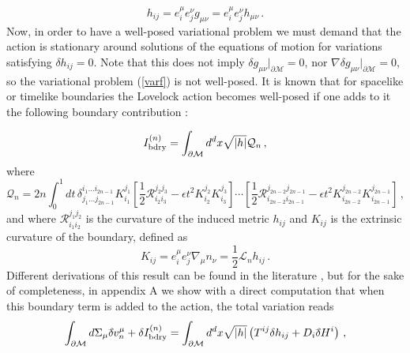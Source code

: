 \documentclass[11pt,letterpaper]{article}
\newcommand{\dslash}{\delta^{\!\!\!\!-}\!}
\begin{document}
\begin{equation}
h_{ij}=e_i^{\mu}e_j^{\nu}g_{\mu\nu}=e_i^{\mu}e_j^{\nu}h_{\mu\nu}\, .
\end{equation}
Now, in order to have a well-posed variational problem we must demand that the action is stationary around solutions of the equations of motion for variations satisfying $\delta h_{ij}=0$.  Note that this does not imply $\delta g_{\mu\nu}\Big|_{\partial \mathcal{M}}=0$, nor $\nabla\delta g_{\mu\nu}\Big|_{\partial \mathcal{M}}=0$, so the variational problem (\ref{varf}) is not well-posed. It is known that for spacelike or timelike boundaries the Lovelock action becomes well-posed if one adds to it the following boundary contribution \cite{Teitelboim:1987zz,Myers:1987yn}:

\begin{equation}\label{bdry}
I_{\rm bdry}^{(n)}=\int_{\partial \mathcal{M}}d^{d}x\sqrt{|h|}\mathcal{Q}_{n}\, ,
\end{equation}
where
\begin{equation}
\mathcal{Q}_{n}=2n\int_0^1dt\, \delta^{i_1\dots i_{2n-1}}_{j_1\dots j_{2n-1}}K^{j_1}_{i_1}\left[\frac{1}{2}\mathcal{R}^{j_2 j_3}_{i_2i_3}-\epsilon t^2K^{j_2}_{i_2}K^{j_3}_{i_3}\right]\cdots \left[\frac{1}{2}\mathcal{R}^{j_{2n-2}j_{2n-1}}_{i_{2n-2}i_{2n-1}}-\epsilon t^2K^{j_{2n-2}}_{i_{2n-2}}K^{j_{2n-1}}_{i_{2n-1}}\right]\, ,
\label{Qterm}
\end{equation}
and where $\mathcal{R}^{j_1j_2}_{i_1i_2}$ is the curvature of the induced metric $h_{ij}$ and $K_{ij}$ is the extrinsic curvature of the boundary, defined as
\begin{equation}
K_{ij}=e^{\mu}_{i}e^{\nu}_{j}\nabla_{\mu}n_{\nu}=\frac{1}{2}\mathcal{L}_{n} h_{ij}\, .
\end{equation}
Different derivations of this result can be found in the literature \cite{Chakraborty:2017zep}, but for the sake of completeness, in appendix A we show with a direct computation that when this boundary term is added to the action, the total variation reads
\begin{equation}\label{var}
\int_{\partial \mathcal{M}} d\Sigma_{\mu}\dslash  v^{\mu}_{n}+\delta I_{\rm bdry}^{(n)}=\int_{\partial\mathcal{M}} d^{d}x\sqrt{|h|}\left( T^{ij}\delta h_{ij}+D_i \dslash H^i\right)\, ,
\end{equation}
\end{document}
